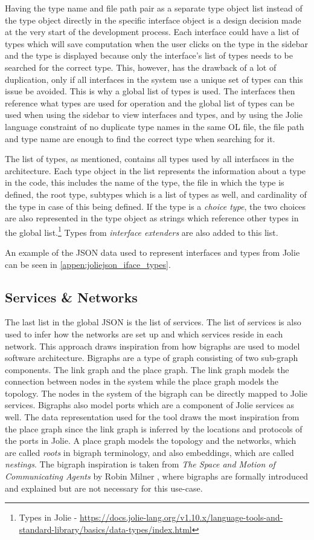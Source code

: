 Having the type name and file path pair as a separate type object list instead of the type object directly in the specific interface object is a design decision made at the very start of the development process.
Each interface could have a list of types which will save computation when the user clicks on the type in the sidebar and the type is displayed because only the interface's list of types needs to be searched for the correct type.
This, however, has the drawback of a lot of duplication, only if all interfaces in the system use a unique set of types can this issue be avoided.
This is why a global list of types is used. The interfaces then reference what types are used for operation and the global list of types can be used when using the sidebar to view interfaces and types, and by
using the Jolie language constraint of no duplicate type names in the same OL file, the file path and type name are enough to find the correct type when searching for it.

The list of types, as mentioned, contains all types used by all interfaces in the architecture.
Each type object in the list represents the information about a type in the code, this includes the name of the type, the file in which the type is defined, the root type, subtypes which is a list of types as well, and cardinality of the type in case of this being defined.
If the type is a \emph{choice type}, the two choices are also represented in the type object as strings which reference other types in the global list.\footnote{Types in Jolie - \url{https://docs.jolie-lang.org/v1.10.x/language-tools-and-standard-library/basics/data-types/index.html}}
Types from \emph{interface extenders} are also added to this list.

An example of the JSON data used to represent interfaces and types from Jolie can be seen in \cref{appen:joliejson_iface_types}.

\subsection{Services \& Networks}
The last list in the global JSON is the list of services. The list of services is also used to infer how the networks are set up and which services reside in each network.
This approach draws inspiration from how bigraphs are used to model software architecture. Bigraphs are a type of graph consisting of two sub-graph components. The link graph and the place graph. The link graph models the connection between nodes in the system while the place graph models the topology.
The nodes in the system of the bigraph can be directly mapped to Jolie services. Bigraphs also model ports which are a component of Jolie services as well.
The data representation used for the tool draws the most inspiration from the place graph since the link graph is inferred by the locations and protocols of the ports in Jolie.
A place graph models the topology and the networks, which are called \emph{roots} in bigraph terminology, and also embeddings, which are called \emph{nestings}.
The bigraph inspiration is taken from \emph{The Space and Motion of Communicating Agents} by Robin Milner \cite{BigraphBook}, where bigraphs are formally introduced and explained but are not necessary for this use-case.

